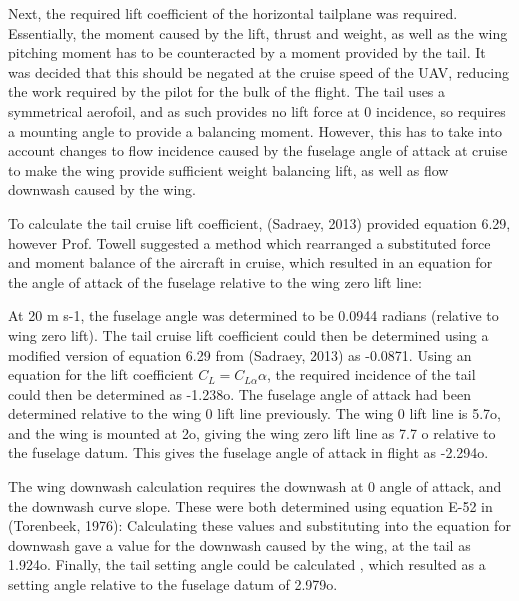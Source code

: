 \documentclass[../../main.tex]{subfiles}
\begin{document}
Next, the required lift coefficient of the horizontal tailplane was required.
Essentially, the moment caused by the lift, thrust and weight, as well as the wing pitching moment has to be counteracted by a moment provided by the tail.
It was decided that this should be negated at the cruise speed of the UAV, reducing the work required by the pilot for the bulk of the flight.
The tail uses a symmetrical aerofoil, and as such provides no lift force at 0 incidence, so requires a mounting angle to provide a balancing moment.
However, this has to take into account changes to flow incidence caused by the fuselage angle of attack at cruise to make the wing provide sufficient weight balancing lift, as well as flow downwash caused by the wing. 

To calculate the tail cruise lift coefficient, (Sadraey, 2013) provided equation 6.29, however Prof. Towell suggested a method which rearranged a substituted force and moment balance of the aircraft in cruise, which resulted in an equation for the angle of attack of the fuselage relative to the wing zero lift line: 


At 20 m s-1, the fuselage angle was determined to be 0.0944 radians (relative to wing zero lift).
The tail cruise lift coefficient could then be determined using a modified version of equation 6.29 from (Sadraey, 2013) as -0.0871.
Using an equation for the lift coefficient $C_L = C_{L\alpha}\alpha$, the required incidence of the tail could then be determined as -1.238o.
The fuselage angle of attack had been determined relative to the wing 0 lift line previously.
The wing 0 lift line is 5.7o, and the wing is mounted at 2o, giving the wing zero lift line as 7.7 o relative to the fuselage datum.
This gives the fuselage angle of attack in flight as -2.294o.  

The wing downwash calculation requires the downwash at 0 angle of attack, and the downwash curve slope.
These were both determined using equation E-52 in (Torenbeek, 1976): Calculating these values and substituting into the equation for downwash gave a value for the downwash caused by the wing, at the tail as 1.924o.
Finally, the tail setting angle could be calculated , which resulted as a setting angle relative to the fuselage datum of 2.979o. 

\end{document}
